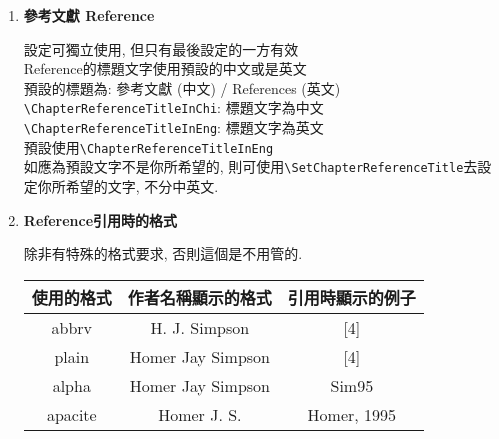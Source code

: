 \begin{enumerate}
{\begin{description}
     預設的格式:\\
     Chapter: Appendix A
     Section: A.1\\
     SubSection: A.1.1\\
     SubSubSection: (空白, 只有題目)

    如果 `章' 要由文字改使用為:\verb|'Appendix A' -> '附錄 A'|\\
    則使用\verb|\AppendixChapterTitleNumFormat{附錄 \StyleAppixCNumUpperAlph}|

     其他的使用方式跟`章節標題的設定'相同.

    \end{description}
  } %

  \newpage
  \item
  {
    \textbf{參考文獻 Reference}

     設定可獨立使用, 但只有最後設定的一方有效\\

     Reference的標題文字使用預設的中文或是英文\\
     預設的標題為: 參考文獻 (中文) / References (英文)\\
     \verb|\ChapterReferenceTitleInChi|:  標題文字為中文\\
     \verb|\ChapterReferenceTitleInEng|:  標題文字為英文\\
     預設使用\verb|\ChapterReferenceTitleInEng|\\

     如應為預設文字不是你所希望的,  則可使用\verb|\SetChapterReferenceTitle|去設定你所希望的文字, 不分中英文.
  } %

  \item
  {
    \textbf{Reference引用時的格式}

    除非有特殊的格式要求, 否則這個是不用管的.\\

  \InsertTable
    {
        \begin{tabular}{|c|c|c|}
        \hline
        使用的格式   & 作者名稱顯示的格式         & 引用時顯示的例子    \\ \hline
        abbrv   & H. J. Simpson     & {[}4{]}     \\ \hline
        plain   & Homer Jay Simpson & {[}4{]}     \\ \hline
        alpha   & Homer Jay Simpson & Sim95       \\ \hline
        apacite & Homer J. S.       & Homer, 1995 \\ \hline
        \end{tabular}
    }

}
\end{enumerate}
